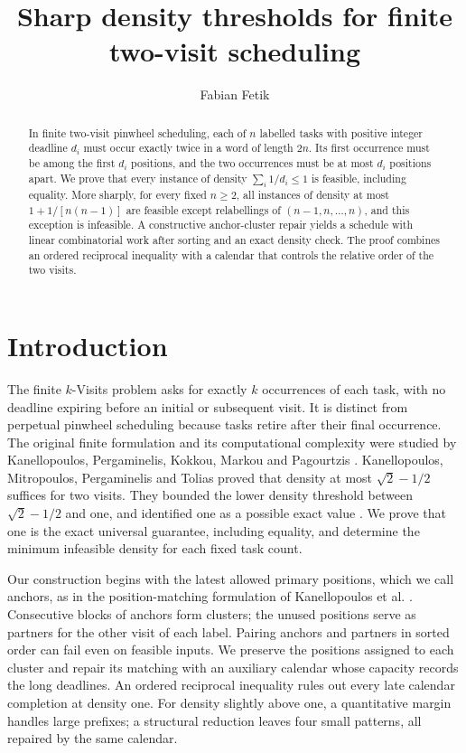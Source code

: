 \documentclass[11pt,a4paper]{article}
\title{Sharp density thresholds for finite two-visit scheduling}
\author{Fabian Fetik}
\date{}
\begin{document}
\maketitle
\begin{abstract}
In finite two-visit pinwheel scheduling, each of \(n\) labelled tasks with positive integer deadline \(d_i\) must occur exactly twice in a word of length \(2n\). Its first occurrence must be among the first \(d_i\) positions, and the two occurrences must be at most \(d_i\) positions apart. We prove that every instance of density \(\sum_i 1/d_i\le1\) is feasible, including equality. More sharply, for every fixed \(n\ge2\), all instances of density at most \(1+1/[n(n-1)]\) are feasible except relabellings of \((n-1,n,\ldots,n)\), and this exception is infeasible. A constructive anchor-cluster repair yields a schedule with linear combinatorial work after sorting and an exact density check. The proof combines an ordered reciprocal inequality with a calendar that controls the relative order of the two visits.
\end{abstract}
\hypertarget{introduction}{%
\section*{Introduction}\label{introduction}}

The finite \(k\)-Visits problem asks for exactly \(k\) occurrences of each task, with no deadline expiring before an initial or subsequent visit. It is distinct from perpetual pinwheel scheduling because tasks retire after their final occurrence. The original finite formulation and its computational complexity were studied by Kanellopoulos, Pergaminelis, Kokkou, Markou and Pagourtzis \cite{ref:KPK+26}. Kanellopoulos, Mitropoulos, Pergaminelis and Tolias \cite[Theorem 44]{ref:KMPT26} proved that density at most \(\sqrt2-1/2\) suffices for two visits. They bounded the lower density threshold between \(\sqrt2-1/2\) and one, and identified one as a possible exact value \cite[Section 8]{ref:KMPT26}. We prove that one is the exact universal guarantee, including equality, and determine the minimum infeasible density for each fixed task count.

Our construction begins with the latest allowed primary positions, which we call anchors, as in the position-matching formulation of Kanellopoulos et al. \cite{ref:KPK+26}. Consecutive blocks of anchors form clusters; the unused positions serve as partners for the other visit of each label. Pairing anchors and partners in sorted order can fail even on feasible inputs. We preserve the positions assigned to each cluster and repair its matching with an auxiliary calendar whose capacity records the long deadlines. An ordered reciprocal inequality rules out every late calendar completion at density one. For density slightly above one, a quantitative margin handles large prefixes; a structural reduction leaves four small patterns, all repaired by the same calendar.
\end{document}
